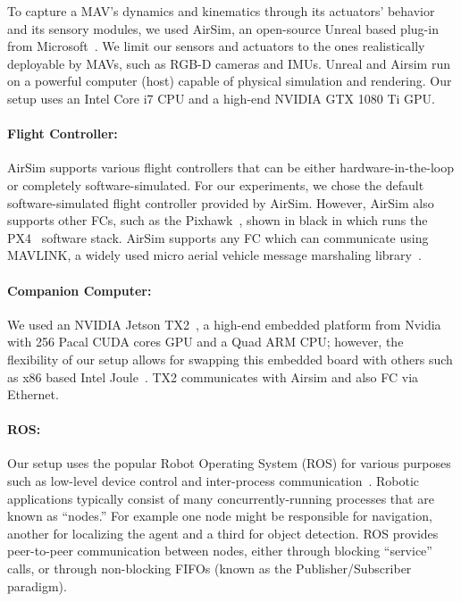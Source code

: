 {To capture a MAV's dynamics and kinematics through its actuators' behavior and its sensory modules, we used AirSim, an open-source Unreal based plug-in from Microsoft~\cite{Airsim:online}. We limit our sensors and actuators to the ones realistically deployable by MAVs, such as \mbox{RGB-D} cameras and IMUs. Unreal and Airsim run on a powerful computer (host) capable of physical simulation and rendering. Our setup uses an Intel Core i7 CPU and a high-end NVIDIA GTX 1080 Ti GPU.  

\paragraph{Flight Controller:} AirSim supports various flight controllers that can be either hardware-in-the-loop or completely software-simulated. For our experiments, we chose the default software-simulated flight controller provided by AirSim. However, AirSim also supports other FCs, such as the Pixhawk~\cite{Pixhawk:online}, shown in black in  which runs the PX4~\cite{PX4Archi7:online} software stack. AirSim supports any FC which can communicate using MAVLINK, a widely used micro aerial vehicle message marshaling library~\cite{mavlinkm68:online}. %


\paragraph{Companion Computer:} We used an NVIDIA Jetson TX2~\cite{TX2}, a high-end embedded platform from Nvidia with 256 Pacal CUDA cores GPU and a Quad ARM CPU; however, the flexibility of our setup allows for swapping this embedded board with others such as x86 based Intel Joule~\cite{joule:online}. TX2 communicates with Airsim and also FC via Ethernet.

\paragraph{ROS:} Our setup uses the popular Robot Operating System (ROS) for various purposes such as low-level device control and inter-process communication~\cite{ROSorgPo80:online}.
Robotic applications typically consist of many concurrently-running processes that are known as ``nodes.'' For example one node might be responsible for navigation, another for localizing the agent and a third for object detection. ROS provides peer-to-peer communication between nodes, either through blocking ``service'' calls, or through non-blocking FIFOs (known as the Publisher/Subscriber paradigm). %

}
